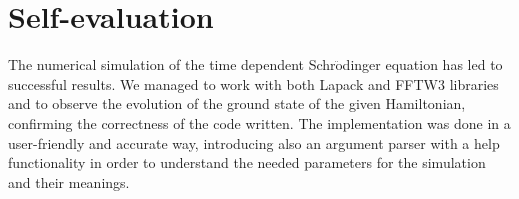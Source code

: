 \documentclass[pra, onecolumn, notitlepage, floats, 11pt]{revtex4-1}
\begin{document}
\section{Self-evaluation}
The numerical simulation of the time dependent Schr$\mathrm{\ddot{o}}$dinger equation has led to successful results. We managed to work with both Lapack and FFTW3 libraries and to observe the evolution of the ground state of the given Hamiltonian, confirming the correctness of the code written. The implementation was done in a user-friendly and accurate way, introducing also an argument parser with a help functionality in order to understand the needed parameters for the simulation and their meanings.
\end{document}
